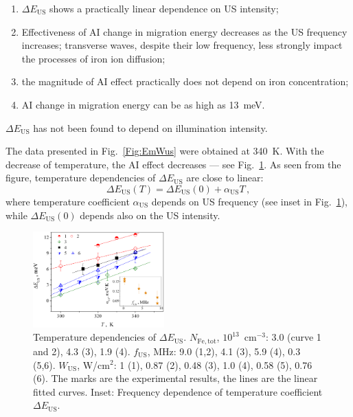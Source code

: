 \documentclass[%
 aip,jap,
 amsmath,amssymb,
 reprint,%
]{revtex4-1}
\begin{document}
\begin{enumerate}
  \item $\Delta E_\mathrm{US}$ shows a practically linear dependence on US intensity;
  \item Effectiveness of AI change in migration energy decreases as the US frequency increases; transverse waves, despite their low frequency, less strongly impact the processes of iron ion diffusion;
  \item the magnitude of AI effect practically does not depend on iron concentration;
  \item AI change in migration energy can be as high as 13~meV.
\end{enumerate}

$\Delta E_\mathrm{US}$ has not been found to depend on illumination intensity.

The data presented in Fig.~\ref{Fig:EmWus} were obtained at 340~K.
With the decrease of temperature, the AI effect  decreases –-- see Fig.~\ref{Fig:EmT}.
As seen from the figure, temperature dependencies of $\Delta E_\mathrm{US}$ are close to linear:
\begin{equation}
\label{eqEmT}
\Delta E_\mathrm{US}(T)=\Delta E_\mathrm{US}(0)+\alpha_\mathrm{US}T\,,
\end{equation}
where temperature coefficient $\alpha_\mathrm{US}$ depends on US frequency
(see inset in Fig.~\ref{Fig:EmT}), while $\Delta E_\mathrm{US}(0)$ depends also on the US intensity.

\begin{figure}
\includegraphics[width=0.45\textwidth]{Fig7}%
\caption{\label{Fig:EmT}
Temperature dependencies of $\Delta E_\mathrm{US}$.
$N_\mathrm{Fe,tot}$, $10^{13}$~cm$^{-3}$:
3.0 (curve 1 and 2), 4.3 (3), 1.9 (4).
$f_\mathrm{US}$, MHz: 9.0 (1,2), 4.1 (3), 5.9 (4), 0.3 (5,6).
$W_\mathrm{US}$, W/cm$^2$: 1 (1), 0.87 (2), 0.48 (3), 1.0 (4), 0.58 (5), 0.76 (6).
The marks are the experimental results, the lines are the linear fitted curves.
Inset: Frequency dependence of temperature coefficient $\Delta E_\mathrm{US}$.
}
\end{figure}
\end{document}
